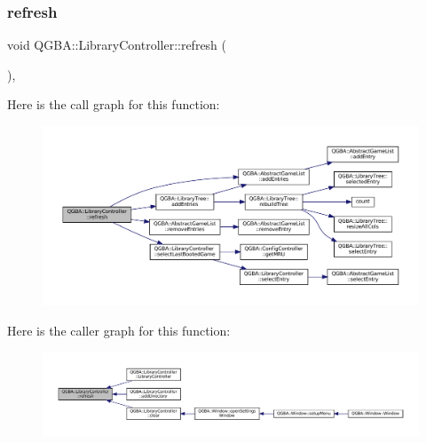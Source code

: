 \subsubsection{\texorpdfstring{refresh}{refresh}}
{\footnotesize\ttfamily void Q\+G\+B\+A\+::\+Library\+Controller\+::refresh (\begin{DoxyParamCaption}{ }\end{DoxyParamCaption})\hspace{0.3cm}{\ttfamily [private]}, {\ttfamily [slot]}}

Here is the call graph for this function\+:
\nopagebreak
\begin{figure}[H]
\begin{center}
\leavevmode
\includegraphics[width=350pt]{class_q_g_b_a_1_1_library_controller_a41b89cf89ef004789161172657410379_cgraph}
\end{center}
\end{figure}
Here is the caller graph for this function\+:
\nopagebreak
\begin{figure}[H]
\begin{center}
\leavevmode
\includegraphics[width=350pt]{class_q_g_b_a_1_1_library_controller_a41b89cf89ef004789161172657410379_icgraph}
\end{center}
\end{figure}
\mbox{\label{class_q_g_b_a_1_1_library_controller_afa408861ab054246525f8d2b62610133}} 
